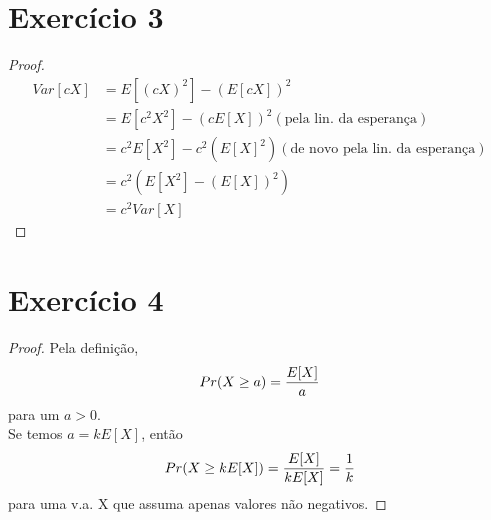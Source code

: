 \documentclass{article}
\begin{document}
\section{Exercício 3}
\begin{proof}
\begin{equation}
	\begin{split}
		Var[cX] &= E[(cX)^2] - (E[cX])^2\\
		&= E[c^2X^2] - (cE[X])^2(\text{pela lin. da esperança})\\
		&= c^2E[X^2] - c^2 (E[X]^2) (\text{de novo pela lin. da esperança})\\
		&= c^2(E[X^2] - (E[X])^2)\\
		&= c^2Var[X]
	\end{split}
\end{equation}
\end{proof}

\section{Exercício 4}
\begin{proof}
	\hspace*{15pt}Pela definição,
	\begin{equation}
		\notag
		Pr(X \geq a) = \dfrac{E[X]}{a}
	\end{equation}
	para um $a > 0$.\\

	Se temos $a = kE[X]$, então
	\begin{equation}
		\notag
		Pr(X \geq kE[X]) = \dfrac{E[X]}{kE[X]} = \dfrac{1}{k}
	\end{equation}
	para uma v.a. X que assuma apenas valores não negativos.
\end{proof}
\end{document}
